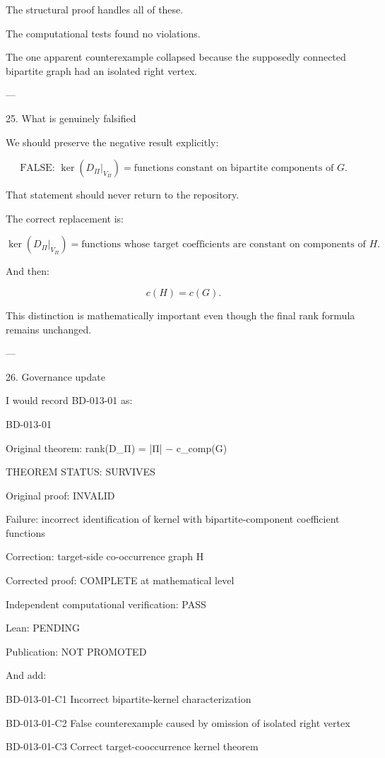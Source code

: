 The structural proof handles all of these.

The computational tests found no violations.

The one apparent counterexample collapsed because the supposedly connected bipartite graph had an isolated right vertex.


---

25. What is genuinely falsified

We should preserve the negative result explicitly:

\[
\boxed{
\text{FALSE: }
\ker(D_\Pi|_{V_\Pi})
=
\text{functions constant on bipartite components of }G.
}
\]

That statement should never return to the repository.

The correct replacement is:

\[
\boxed{
\ker(D_\Pi|_{V_\Pi})
=
\text{functions whose target coefficients are constant on components of }H.
}
\]

And then:

\[
\boxed{
c(H)=c(G).
}
\]

This distinction is mathematically important even though the final rank formula remains unchanged.


---

26. Governance update

I would record BD-013-01 as:

BD-013-01

Original theorem:
    rank(D_Π) = |Π| − c_comp(G)

THEOREM STATUS:
    SURVIVES

Original proof:
    INVALID

Failure:
    incorrect identification of kernel with bipartite-component
    coefficient functions

Correction:
    target-side co-occurrence graph H

Corrected proof:
    COMPLETE at mathematical level

Independent computational verification:
    PASS

Lean:
    PENDING

Publication:
    NOT PROMOTED

And add:

BD-013-01-C1
Incorrect bipartite-kernel characterization

BD-013-01-C2
False counterexample caused by omission of isolated right vertex

BD-013-01-C3
Correct target-cooccurrence kernel theorem

